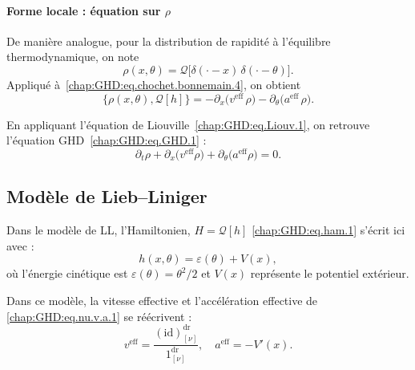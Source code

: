 \paragraph{Forme locale : équation sur \texorpdfstring{$\rho$}{rho}} 
De manière analogue, pour la distribution de rapidité à l’équilibre thermodynamique, on note
\begin{equation}
	\rho(x,\theta) = \mathcal{Q}\big[ \delta(\cdot - x) \, \delta(\cdot - \theta) \big].
\end{equation}
Appliqué à~\eqref{chap:GHD:eq.chochet.bonnemain.4}, on obtient
\begin{equation}\label{chap:GHD:eq.chochet.bonnemain.6}
	\{\rho(x,\theta), \mathcal{Q}[h]\} 
	= - \partial_x \big( v^{\mathrm{eff}} \, \rho \big)
	  - \partial_\theta \big( a^{\mathrm{eff}} \, \rho \big).
\end{equation}

En appliquant l’équation de Liouville~\eqref{chap:GHD:eq.Liouv.1}, on retrouve l’équation \gls{GHD}~\eqref{chap:GHD:eq.GHD.1} :
\begin{equation*}\label{chap:GHD:eq.conserv.3}
	\partial_t \rho + \partial_x \big( v^{\mathrm{eff}} \rho \big)
	+ \partial_\theta \big( a^{\mathrm{eff}} \rho \big) = 0.
\end{equation*}

\subsection{Modèle de Lieb–Liniger}

Dans le modèle de \gls{LL}, l’Hamiltonien, $H = \mathcal{Q}[h]$ \eqref{chap:GHD:eq.ham.1} s’écrit ici avec :
\begin{equation}\label{chap:GHD:eq.ham.2}
	h(x , \theta ) = \varepsilon(\theta) + V(x),
\end{equation}
où l’énergie cinétique est $\varepsilon(\theta) = \theta^2 / 2$ et $V(x)$ représente le potentiel extérieur.

\medskip

Dans ce modèle, la vitesse effective et l’accélération effective de \eqref{chap:GHD:eq.nu.v.a.1} se réécrivent :
\begin{equation}\label{chap:GHD:eq.nu.v.a.1.1111}
	v^{\mathrm{eff}} = \frac{(\mathrm{id})^{\mathrm{dr}}_{[\nu]}}{1^{\mathrm{dr}}_{[\nu]}}, 
	\quad a^{\mathrm{eff}} = - V'(x).
\end{equation}

